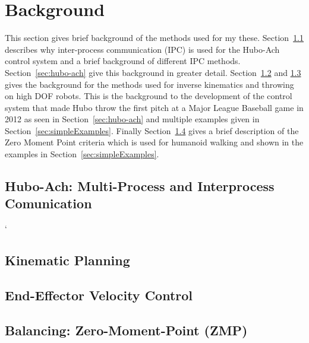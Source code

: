 \chapter{Background}\label{sec:background}

This section gives brief background of the methods used for my these.
Section~\ref{sec:back:hubo-ach} describes why inter-process communication (IPC) is used for the Hubo-Ach control system and a brief background of different IPC methods.
Section~\ref{sec:hubo-ach} give this background in greater detail.
Section~\ref{sec:back:ik} and \ref{sec:back:eefvelos} gives the background for the methods used for inverse kinematics and throwing on high DOF robots.
This is the background to the development of the control system that made Hubo throw the first pitch at a Major League Baseball game in 2012 as seen in Section~\ref{sec:hubo-ach} and multiple examples given in Section~\ref{sec:simpleExamples}.
Finally Section~\ref{sec:zmp} gives a brief description of the Zero Moment Point criteria which is used for humanoid walking and shown in the examples in Section~\ref{sec:simpleExamples}.

		
		\section{Hubo-Ach: Multi-Process and Interprocess Comunication}\label{sec:back:hubo-ach}
`	    		
		\section{Kinematic Planning}\label{sec:back:ik}
			
		\section{End-Effector Velocity Control}\label{sec:back:eefvelos}
			
%			
		\section{Balancing: Zero-Moment-Point (ZMP)}\label{sec:zmp}
			
